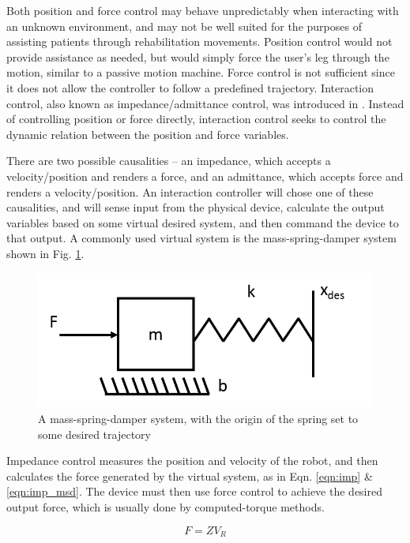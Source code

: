 \documentclass[12pt]{report}
\begin{document}
Both position and force control may behave unpredictably when interacting with an unknown environment, and may not be well suited for the purposes of assisting patients through rehabilitation movements. Position control would not provide assistance as needed, but would simply force the user's leg through the motion, similar to a passive motion machine. Force control is not sufficient since it does not allow the controller to follow a predefined trajectory. Interaction control, also known as impedance/admittance control, was introduced in \cite{Hogan1985}. Instead of controlling position or force directly, interaction control seeks to control the dynamic relation between the position and force variables. 
	
There are two possible causalities -- an impedance, which accepts a velocity/position and renders a force, and an admittance, which accepts force and renders a velocity/position. An interaction controller will chose one of these causalities, and will sense input from the physical device, calculate the output variables based on some virtual desired system, and then command the device to that output. A commonly used virtual system is the mass-spring-damper system shown in Fig. \ref{fig:mass-spring-damper}. 

	\begin{figure}[h] 
		\centering
		\includegraphics[width=0.75\linewidth]{admittance_sys}
		\caption{A mass-spring-damper system, with the origin of the spring set to some desired trajectory}
		\label{fig:mass-spring-damper}
	\end{figure}
	
Impedance control measures the position and velocity of the robot, and then calculates the force generated by the virtual system, as in Eqn. \ref{eqn:imp} \& \ref{eqn:imp_msd}. The device must then use force control to achieve the desired output force, which is usually done by computed-torque methods. 

\begin{equation} \label{eqn:imp}
	F = ZV_R 
\end{equation}  
\end{document}
